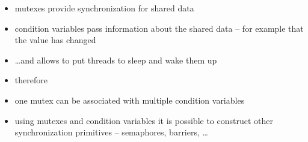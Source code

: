 
\begin{slide}
\begin{itemize}
\item mutexes provide synchronization for shared data
\item condition variables pass information about the shared data --
for example that the value has changed
\item \dots{}and allows to put threads to sleep and wake them up
\item therefore 
\item one mutex can be associated with multiple condition variables
\item using mutexes and condition variables it is possible to construct
other synchronization primitives -- semaphores, barriers, \dots
\end{itemize}
\end{slide}


